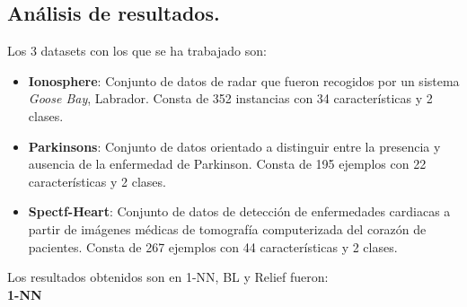 \documentclass[11pt,a4paper]{article}
\theoremstyle{definition}
\begin{document}
		\subsection{Análisis de resultados.}
	Los 3 datasets con los que se ha trabajado son:
	\begin{itemize}
		\item \textbf{Ionosphere}: Conjunto de datos de radar que fueron recogidos por un sistema \textit{Goose Bay}, Labrador. Consta de 352 instancias con 34 características y 2 clases.
		\item \textbf{Parkinsons}: Conjunto de datos orientado a distinguir entre la presencia y ausencia de la enfermedad de Parkinson. Consta de 195 ejemplos con 22 características y 2 clases.
		\item \textbf{Spectf-Heart}: Conjunto de datos de detección de enfermedades cardiacas a partir de imágenes médicas de tomografía computerizada del corazón de pacientes. Consta de 267 ejemplos con 44 características y 2 clases.
	\end{itemize}
	\iffalse
	Los resultados obtenidos son en 1-NN, BL y Relief fueron:~\\
	
		\textbf{1-NN}
\end{document}
